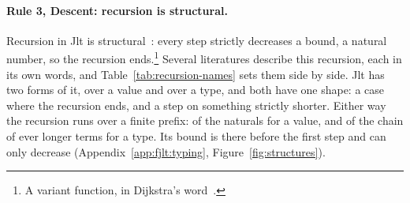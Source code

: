 \paragraph{Rule 3, Descent: recursion is structural.}
\label{def:rule3}
Recursion in Jlt is structural~\cite{burstall1969proving}: every step strictly decreases a bound, a natural number, so the recursion ends.\footnote{A variant function, in Dijkstra's word~\cite{dijkstra1976discipline}.}
Several literatures describe this recursion, each in its own words, and Table~\ref{tab:recursion-names} sets them side by side.
Jlt has two forms of it, over a value and over a type, and both have one shape: a case where the recursion ends, and a step on something strictly shorter.
Either way the recursion runs over a finite prefix: of the naturals for a value, and of the chain of ever longer terms for a type.
Its bound is there before the first step and can only decrease (Appendix~\ref{app:fjlt:typing}, Figure~\ref{fig:structures}).

